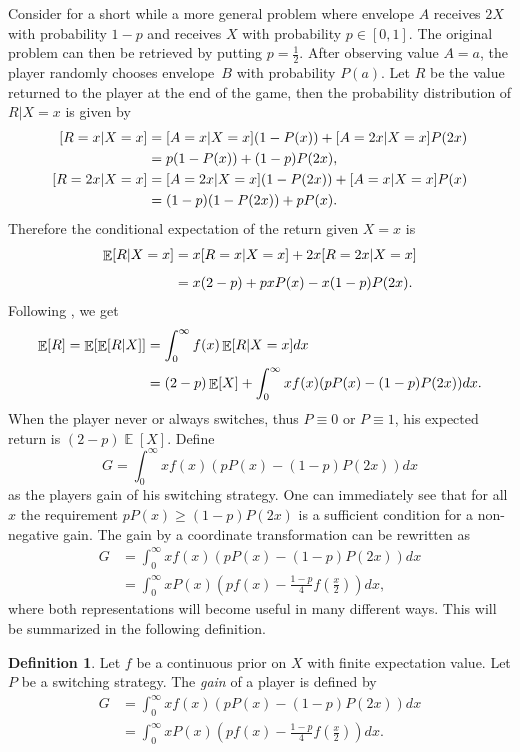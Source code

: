 \documentclass[a4paper]{report}
\theoremstyle{plain}
\theoremstyle{definition}
\newtheorem{definition}[theorem]{Definition}
\theoremstyle{remark}
\numberwithin{equation}{chapter}
\let\P\relax
\DeclareMathOperator{\P}{\mathbb{P}}
\DeclareMathOperator{\E}{\mathbb{E}}
\DeclareMathOperator{\1}{\mathbbm{1}}
\begin{document}
Consider for a short while a more general problem where envelope $A$ receives $2X$ with probability $1-p$ and receives $X$ with probability $p\in[0,1]$. The original problem can then be retrieved by putting $p=\frac{1}{2}$. After observing value $A=a$, the player randomly chooses envelope~$B$ with probability $P(a)$. Let $R$ be the value returned to the player at the end of the game, then the probability distribution of $R|X=x$ is given by
\begin{align}
\P[R=x|X=x]&=\P[A=x|X=x](1-P(x))+\P[A=2x|X=x]P(2x)\\
&=p(1-P(x))+(1-p)P(2x),\\
\P[R=2x|X=x]&=\P[A=2x|X=x](1-P(2x))+\P[A=x|X=x]P(x)\\
&=(1-p)(1-P(2x))+pP(x).
\end{align}
Therefore the conditional expectation of the return given $X=x$ is
\begin{align}
\E_{\P}[R|X=x]&=x\P[R=x|X=x]+2x\P[R=2x|X=x]\\
&=x(2-p)+pxP(x)-x(1-p)P(2x).
\end{align}
Following \cite{McDonnell09}, we get
\begin{align}
\E_{\P}[R]=\E_{\P}[\E_{\P}[R|X]]&=\int_0^\infty f(x)\E_{\P}[R|X=x]dx\\
&=(2-p)\E_{\P}[X]+\int_0^\infty xf(x)(pP(x)-(1-p)P(2x))dx.
\end{align}
When the player never or always switches, thus $P\equiv0$ or $P\equiv1$, his expected return is $(2-p)\E[X]$. Define
\begin{equation}
G=\int_0^\infty xf(x)(pP(x)-(1-p)P(2x))dx
\end{equation}
as the players gain of his switching strategy. One can immediately see that for all $x$ the requirement $pP(x)\geq(1-p)P(2x)$ is a sufficient condition for a non-negative gain. The gain by a coordinate transformation can be rewritten as
\begin{align}
G&=\int_0^\infty xf(x)(pP(x)-(1-p)P(2x))dx\\
&=\int_0^\infty xP(x)\left(pf(x)-\frac{1-p}{4}f\left(\frac{x}{2}\right)\right)dx,
\end{align}
where both representations will become useful in many different ways. This will be summarized in the following definition.
\begin{definition}
Let $f$ be a continuous prior on $X$ with finite expectation value. Let $P$ be a switching strategy. The \emph{gain} of a player is defined by
\begin{align}
G&=\int_0^\infty xf(x)(pP(x)-(1-p)P(2x))dx\label{eq:EnvelopeGainP}\\
&=\int_0^\infty xP(x)\left(pf(x)-\frac{1-p}{4}f\left(\frac{x}{2}\right)\right)dx.\label{eq:EnvelopeGainF}
\end{align}
\end{definition}
\end{document}

